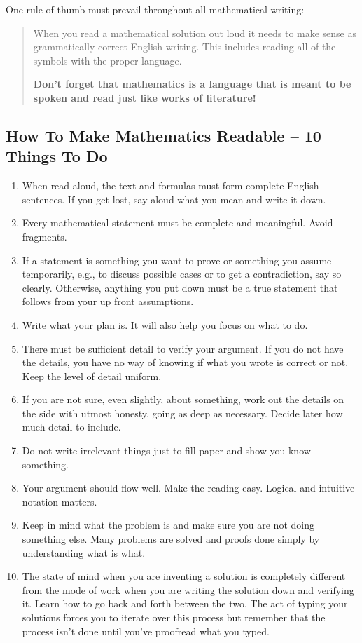 One rule of thumb must prevail throughout all mathematical writing:
\begin{quote}
    When you read a mathematical solution out loud it needs to make sense as
    grammatically correct English writing.  This includes reading all of the symbols with
    the proper language.
    \begin{center}
        {\bf Don't forget that mathematics is a language that is meant to be spoken and
        read just like works of literature!}
    \end{center}
\end{quote}


\subsection{How To Make Mathematics Readable -- 10 Things To Do}
\begin{enumerate}
    \item When read aloud, the text and formulas must form complete English sentences. If
        you get lost, say aloud what you mean and write it down.
    \item Every mathematical statement must be complete and meaningful. Avoid fragments.
    \item If a statement is something you want to prove or something you assume
        temporarily, e.g., to discuss possible cases or to get a contradiction, say so
        clearly. Otherwise, anything you put down must be a true statement that follows
        from your up front assumptions.
    \item Write what your plan is.  It will also help you focus on what to do.
    \item There must be sufficient detail to verify your argument. If you do not have the
        details, you have no way of knowing if what you wrote is correct or not. Keep the
        level of detail uniform.
    \item If you are not sure, even slightly, about something, work out the details on the
        side with utmost honesty, going as deep as necessary. Decide later how much detail
        to include. 
    \item Do not write irrelevant things just to fill paper and show you know something.
    \item Your argument should flow well. Make the reading easy. Logical and intuitive
        notation matters.
    \item Keep in mind what the problem is and make sure you are not doing something else.
        Many problems are solved and proofs done simply by understanding what is what.
    \item The state of mind when you are inventing a solution is completely different from
        the mode of work when you are writing the solution down and verifying it.  Learn
        how to go back and forth between the two. The act of typing your solutions forces
        you to iterate over this process but remember that the process isn't done until
        you've proofread what you typed.
\end{enumerate}



